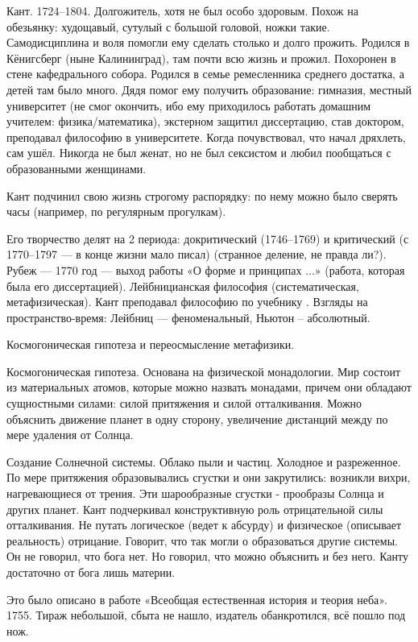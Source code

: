 Кант. 1724--1804. Долгожитель, хотя не был особо здоровым. Похож на обезьянку: худощавый, сутулый с большой головой, ножки такие. Самодисциплина и воля помогли ему сделать столько и долго прожить.
Родился в Кёнигсберг (ныне Калининград), там почти всю жизнь и прожил.
Похоронен в стене кафедрального собора. 
Родился в семье ремесленника среднего достатка, а детей там было много. Дядя помог ему получить образование: гимназия, местный университет (не смог окончить, ибо ему приходилось работать домашним учителем: физика/математика), экстерном защитил диссертацию, став доктором, преподавал философию в университете. Когда почувствовал, что начал дряхлеть, сам ушёл. Никогда не был женат, но не был сексистом и любил пообщаться с образованными женщинами.

Кант подчинил свою жизнь строгому распорядку: по нему можно было сверять часы (например, по регулярным прогулкам). 

Его творчество делят на 2 периода: докритический (1746--1769) и критический (с 1770--1797 --- в конце жизни мало писал) (странное деление, не правда ли?).  Рубеж --- 1770 год --- выход работы «О форме и принципах ...» (работа, которая была его диссертацией). 
Лейбницианская философия (систематическая, метафизическая). Кант преподавал философию по учебнику \na.
Взгляды на пространство-время: Лейбниц --- феноменальный, Ньютон -- абсолютный.

Космогоническая гипотеза и переосмысление метафизики. 

Космогоническая гипотеза. Основана на физической монадологии. 
Мир состоит из материальных атомов, которые можно назвать монадами, причем они обладают сущностными силами: силой притяжения и силой отталкивания.
Можно объяснить движение планет в одну сторону, увеличение дистанций между по мере удаления от Солнца.

Создание Солнечной системы. Облако пыли и частиц. Холодное и разреженное. По мере притяжения образовывались сгустки и они закрутились: возникли вихри, нагревающиеся от трения. 
Эти шарообразные сгустки - прообразы Солнца и других планет. Кант подчеркивал конструктивную роль отрицательной силы отталкивания. 
Не путать логическое (ведет к абсурду) и физическое (описывает реальность) отрицание. 
Говорит, что так могли о образоваться другие системы. 
Он не говорил, что бога нет. Но говорил, что можно объяснить и без него. Канту достаточно от бога лишь материи.

Это было описано в работе «Всеобщая естественная история и теория неба». 1755. Тираж небольшой, сбыта не нашло, издатель обанкротился, всё пошло под нож.

